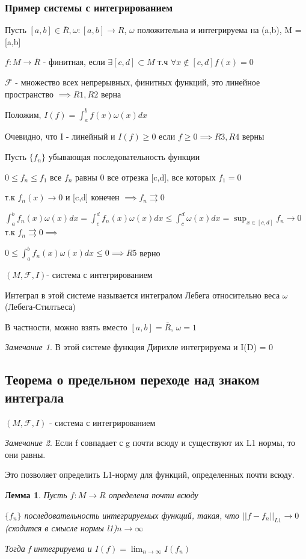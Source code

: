 \documentclass[a4paper, 12pt]{article}
\newtheorem{lemma}{Лемма}[section]
\theoremstyle{definition}
\theoremstyle{remark}
\newtheorem*{remark}{Замечание}
\begin{document}
\subsubsection{Пример системы с интегрированием}
Пусть $[a,b]\in \bar{R}, \omega: [a,b]\to R $, $\omega $ положительна и интегрируема на (a,b), M = [a,b]

$f: M \to \bar{R}$ -  финитная, если $\exists [c,d]\subset M$ т.ч $\forall x\notin [c,d] f(x) = 0$

$\mathcal{F}$ -  множество всех непрерывных, финитных функций, это линейное пространство $\implies R1, R2$ верна 

Положим, $I(f) = \int_a^b f(x)\omega(x)dx$

Очевидно, что I - линейный и $I(f)\geq 0$ если $f\geq 0\implies R3, R4$ верны

Пусть $\{f_n\}$ убывающая последовательность функции 

$0 \leq f_n \leq f_1 $ все $f_n$ равны 0 все отрезка [c,d], все которых $f_1  = 0$

т.к $f_n(x )\to 0$ и [c,d] конечен $\implies f_n\rightrightarrows 0$

$\int_a^b f_n(x)\omega (x)dx = \int_c^d f_n(x)\omega (x)dx \leq \int_c^d \omega(x)dx =\sup_{x\in [c,d]}f_n\to 0$ т.к $f_n\rightrightarrows 0\implies$

$0\leq \int_a^b f_n(x)\omega (x)dx\leq 0\implies R5 $ верно

$(M, \mathcal{F} , I)$- система с интегрированием

Интеграл в этой системе называется интегралом Лебега относительно веса $\omega$ (Лебега-Стилтьеса)

В частности, можно взять вместо $[a,b] = \bar{R}$, $\omega = 1$
\begin{remark}
     В этой системе функция Дирихле интегрируема и I(D) = 0
\end{remark}
\subsection{Теорема о предельном переходе над знаком интеграла}
$(M, \mathcal{F} , I) $ - система с интегрированием
\begin{remark}
     Если f совпадает с g почти всюду и существуют их L1 нормы, то они равны. 

     Это позволяет определить L1-норму для функций, определенных почти всюду.
\end{remark}
\begin{lemma}
     Пусть $f: M\to R$ определена почти всюду
     
     $\{f_n\}$ последовательность интегрируемых функций, такая, что $||f - f_n||_{L1}\to 0 $(сходится в смысле нормы l1)$ n\to \infty$

     Тогда f интегрируема и $I(f) = \lim_{n\to\infty} I(f_n)$
\end{lemma}
\end{document}
